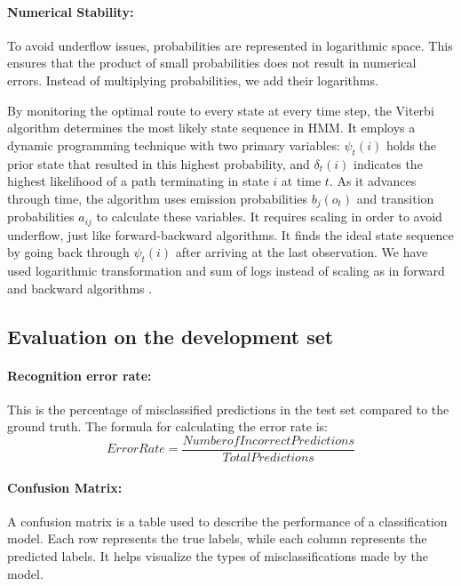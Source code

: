 \documentclass{article}
\begin{document}
\paragraph{Numerical Stability:}
To avoid underflow issues, probabilities are represented in logarithmic space. This ensures that the product of small probabilities does not result in numerical errors. Instead of multiplying probabilities, we add their logarithms.

By monitoring the optimal route to every state at every time step, the Viterbi algorithm determines the most likely state sequence in HMM. It employs a dynamic programming technique with two primary variables: $\psi_t(i)$ holds the prior state that resulted in this highest probability, and $\delta_t(i)$ indicates the highest likelihood of a path terminating in state $i$ at time $t$. As it advances through time, the algorithm uses emission probabilities $b_j(o_t)$ and transition probabilities $a_{ij}$ to calculate these variables. It requires scaling in order to avoid underflow, just like forward-backward algorithms. It finds the ideal state sequence by going back through $\psi_t(i)$ after arriving at the last observation. We have used logarithmic transformation and sum of logs instead of scaling as in forward and backward algorithms \citep{HMM}.






\subsection{Evaluation on the development set}

\paragraph{Recognition error rate:} This is the percentage of misclassified predictions in the test set compared to the ground truth. The formula for calculating the error rate is:
\begin{equation}
	Error Rate = \frac{Number of Incorrect Predictions}{Total Predictions}
\end{equation}

\paragraph{Confusion Matrix:} A confusion matrix is a table used to describe the performance of a classification model. Each row represents the true labels, while each column represents the predicted labels. It helps visualize the types of misclassifications made by the model.
\end{document}
